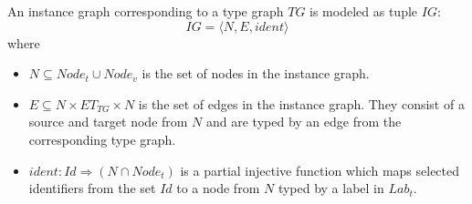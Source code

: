 \begin{defin}
\label{defin:formalisations:groove_formalisation:instance_graphs:instance_graph}
An instance graph corresponding to a type graph $TG$ is modeled as tuple $IG$:
\begin{equation}
    IG = \langle N, E, ident \rangle
\end{equation}
where
\begin{itemize}
    \item $N \subseteq Node_t \cup Node_v$ is the set of nodes in the instance graph.
    
    \item $E \subseteq N \times ET_{TG} \times N$ is the set of edges in the instance graph. They consist of a source and target node from $N$ and are typed by an edge from the corresponding type graph.
    
    \item $ident: Id \Rightarrow (N \cap Node_t)$ is a partial injective function which maps selected identifiers from the set $Id$ to a node from $N$ typed by a label in $Lab_t$.
\end{itemize}

\end{defin}

